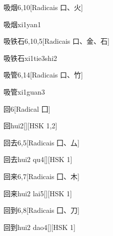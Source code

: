 \begin{entry}{吸烟}{6,10}[Radicais ⼝、⽕]
  \begin{phonetics}{吸烟}{xi1yan1}
  \end{phonetics}
\end{entry}

\begin{entry}{吸铁石}{6,10,5}[Radicais ⼝、⾦、⽯]
  \begin{phonetics}{吸铁石}{xi1tie3shi2}
  \end{phonetics}
\end{entry}

\begin{entry}{吸管}{6,14}[Radicais ⼝、⽵]
  \begin{phonetics}{吸管}{xi1guan3}
  \end{phonetics}
\end{entry}

\begin{entry}{回}{6}[Radical ⼞]
  \begin{phonetics}{回}{hui2}[][HSK 1,2]
  \end{phonetics}
\end{entry}

\begin{entry}{回去}{6,5}[Radicais ⼞、⼛]
  \begin{phonetics}{回去}{hui2 qu4}[][HSK 1]
  \end{phonetics}
\end{entry}

\begin{entry}{回来}{6,7}[Radicais ⼞、⽊]
  \begin{phonetics}{回来}{hui2 lai5}[][HSK 1]
  \end{phonetics}
\end{entry}

\begin{entry}{回到}{6,8}[Radicais ⼞、⼑]
  \begin{phonetics}{回到}{hui2 dao4}[][HSK 1]
  \end{phonetics}
\end{entry}

